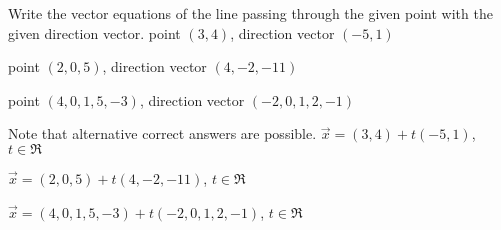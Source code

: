 

\begin{Exercise}[
name={},
title={}, 
difficulty=0,
origin={\cite{SM}}]
Write the vector equations of the line passing through the given point with the given direction vector.
\Question point $(3,4)$, direction vector $(-5,1)$

\Question point $(2,0,5)$, direction vector $(4,-2,-11)$

\Question point $(4,0,1,5,-3)$, direction vector $(-2,0,1,2,-1)$
\end{Exercise}

\begin{Answer}
Note that alternative correct answers are possible.
\Question $\vec{x} = (3,4)+t(-5,1)$, $t\in\Re$

\Question $\vec{x} = (2,0,5) + t(4,-2,-11)$, $t\in\Re$

\Question $\vec{x} = (4,0,1,5,-3) + t(-2,0,1,2,-1)$, $t\in\Re$
\end{Answer}
